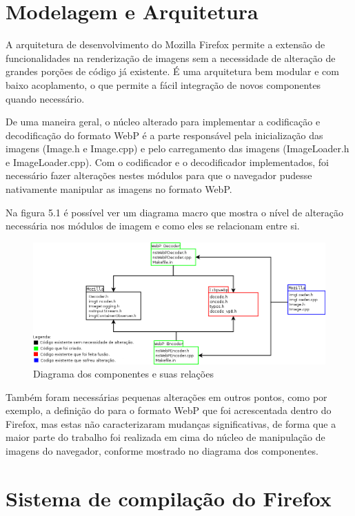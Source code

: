 \documentclass[espaco=simples,appendix=Name]{abnt}
\begin{document}
\section{Modelagem e Arquitetura}

A arquitetura de desenvolvimento do Mozilla Firefox permite a extensão de funcionalidades na renderização de imagens sem a necessidade de alteração de grandes porções de código já existente. É uma arquitetura bem modular e com baixo acoplamento, o que permite a fácil integração de novos componentes quando necessário. 

De uma maneira geral, o núcleo alterado para implementar a codificação e decodificação do formato WebP é a parte responsável pela inicialização das imagens (Image.h e Image.cpp) e pelo carregamento das imagens (ImageLoader.h e ImageLoader.cpp). Com o codificador e o decodificador implementados, foi necessário fazer alterações nestes módulos para que o navegador pudesse nativamente manipular as imagens no formato WebP. 

Na figura 5.1 é possível ver um diagrama macro que mostra o nível de alteração necessária nos módulos de imagem e como eles se relacionam entre si.

\begin{figure}[h]
  \centering
    \includegraphics[scale=0.45]{Arquitetura.png}
  \caption{Diagrama dos componentes e suas relações}
\end{figure}

Também foram necessárias pequenas alterações em outros pontos, como por exemplo, a definição do  para o formato WebP que foi acrescentada dentro do Firefox, mas estas não caracterizaram mudanças significativas, de forma que a maior parte do trabalho foi realizada em cima do núcleo de manipulação de imagens do navegador, conforme mostrado no diagrama dos componentes.

\section{Sistema de compilação do Firefox}
\end{document}
